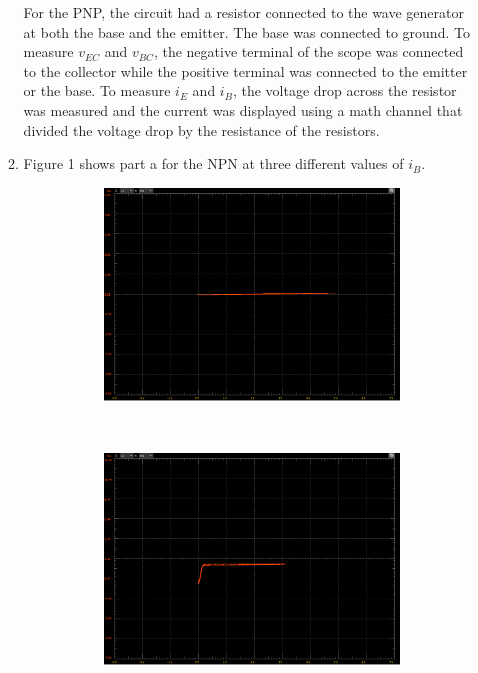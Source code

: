 \documentclass[12pt]{article}
\begin{document}
\begin{enumerate}
\begin{enumerate}
        For the PNP, the circuit had a resistor connected to the wave generator at both the base and the emitter. The base was connected to ground. To measure $v_{EC}$ and $v_{BC}$, the negative terminal of the scope was connected to the collector while the positive terminal was connected to the emitter or the base. To measure $i_E$ and $i_B$, the voltage drop across the resistor was measured and the current was displayed using a math channel that divided the voltage drop by the resistance of the resistors. \newpage
        \item 
        Figure 1 shows part a for the NPN at three different values of $i_B$. \\
        \begin{figure}[h!]
            \centering
            \begin{subfigure}[b]{0.31\textwidth}
                \includegraphics[width=\textwidth]{N1IB0.png}
            \end{subfigure}
            ~
            \begin{subfigure}[b]{0.31\textwidth}
                \includegraphics[width=\textwidth]{N1VB650.png}

\end{subfigure}
\end{figure}
\end{enumerate}
\end{enumerate}
\end{document}
